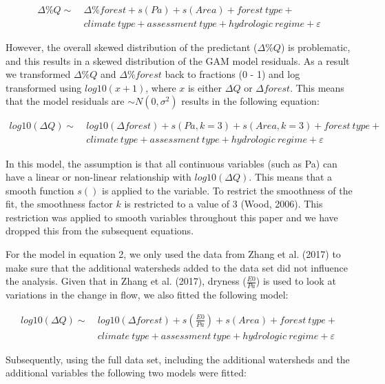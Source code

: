 \documentclass[]{elsarticle} %
\begin{document}
\[\tag{1}
\begin{aligned}
\Delta \%Q \sim ~&\Delta \%forest + s(Pa) + s(Area) +  {forest~type} + \\  &{climate~type} + {assessment~type} + {hydrologic~regime} + \varepsilon
\end{aligned}\]

However, the overall skewed distribution of the predictant
(\(\Delta \%Q\)) is problematic, and this results in a skewed
distribution of the GAM model residuals. As a result we transformed
\(\Delta \%Q\) and \(\Delta \%forest\) back to fractions (0 - 1) and log
transformed using \(log10(x + 1)\), where \(x\) is either \(\Delta Q\)
or \(\Delta forest\). This means that the model residuals are
\(\sim N(0,\sigma^2)\) results in the following equation:

\[\tag{2}
\begin{aligned}
log10(\Delta Q) \sim ~&log10(\Delta forest) + s(Pa, k = 3) + s(Area, k = 3) +  {forest~type} + \\  &{climate~type} + {assessment~type} + {hydrologic~regime} + \varepsilon
\end{aligned}\]

In this model, the assumption is that all continuous variables (such as
Pa) can have a linear or non-linear relationship with
\(log10(\Delta Q)\). This means that a smooth function \(s()\) is
applied to the variable. To restrict the smoothness of the fit, the
smoothness factor \(k\) is restricted to a value of 3 (Wood, 2006). This
restriction was applied to smooth variables throughout this paper and we
have dropped this from the subsequent equations.

For the model in equation 2, we only used the data from Zhang et al.
(2017) to make sure that the additional watersheds added to the data set
did not influence the analysis. Given that in Zhang et al. (2017),
dryness (\(\frac{E0}{Pa}\)) is used to look at variations in the change
in flow, we also fitted the following model:

\[\tag{3}
\begin{aligned}
log10(\Delta Q) \sim ~&log10(\Delta forest) + s(\frac{E0}{Pa}) + s(Area) +  {forest~type} + \\  &{climate~type} + {assessment~type} + {hydrologic~regime} + \varepsilon
\end{aligned}\]

Subsequently, using the full data set, including the additional
watersheds and the additional variables the following two models were
fitted:
\end{document}
